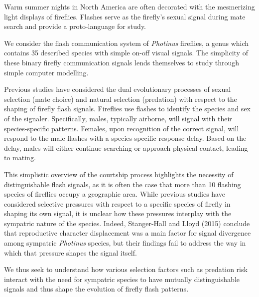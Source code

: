 

Warm summer nights in North America are often decorated with the mesmerizing light displays of fireflies. 
Flashes serve as the firefly's sexual signal during mate search and provide a proto-language for study. 


We consider the flash communication system of {\it Photinus} fireflies, a genus which contains 35 described species with simple on-off visual signals. 
The simplicity of these binary firefly communication signals lends themselves to study through simple computer modelling.

Previous studies have considered the dual evolutionary processes of sexual selection (mate choice) and natural selection (predation) with respect to the shaping of firefly flash signals. 
Fireflies use flashes to identify the species and sex of the signaler. 
Specifically, males, typically airborne, will signal with their species-specific patterns. 
Females, upon recognition of the correct signal, will respond to the male flashes with a species-specific response delay.
Based on the delay, males will either continue searching or approach physical contact, leading to mating. 

This simplistic overview of the courtship process highlights the necessity of distinguishable flash signals, as it is often the case that more than 10 flashing species of fireflies occupy a geographic area. 
While previous studies have considered selective pressures with respect to a specific species of firefly in shaping its own signal, it is unclear how these pressures interplay with the sympatric nature of the species. 
Indeed, Stanger-Hall and Lloyd (2015) conclude that reproductive character displacement was a main factor for signal divergence among sympatric {\it Photinus} species, but their findings fail to address the way in which that pressure shapes the signal itself. 

We thus seek to understand how various selection factors such as predation risk interact with the need for sympatric species to have mutually distinguishable signals and thus shape the evolution of firefly flash patterns. 

